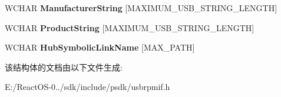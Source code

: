 \begin{DoxyCompactItemize}
W\+C\+H\+AR {\bfseries Manufacturer\+String} \mbox{[}M\+A\+X\+I\+M\+U\+M\+\_\+\+U\+S\+B\+\_\+\+S\+T\+R\+I\+N\+G\+\_\+\+L\+E\+N\+G\+TH\mbox{]}
\item 
\mbox{\label{struct___u_s_b_r_p_m___d_e_v_i_c_e___i_n_f_o_r_m_a_t_i_o_n_a944a87dc3f27776fcbbbfb9d198a40c7}} 
W\+C\+H\+AR {\bfseries Product\+String} \mbox{[}M\+A\+X\+I\+M\+U\+M\+\_\+\+U\+S\+B\+\_\+\+S\+T\+R\+I\+N\+G\+\_\+\+L\+E\+N\+G\+TH\mbox{]}
\item 
\mbox{\label{struct___u_s_b_r_p_m___d_e_v_i_c_e___i_n_f_o_r_m_a_t_i_o_n_a69ceef0f51f1f8cf4c55fe63a59a1e7d}} 
W\+C\+H\+AR {\bfseries Hub\+Symbolic\+Link\+Name} \mbox{[}M\+A\+X\+\_\+\+P\+A\+TH\mbox{]}
\end{DoxyCompactItemize}


该结构体的文档由以下文件生成\+:\begin{DoxyCompactItemize}
\item 
E\+:/\+React\+O\+S-\/0../sdk/include/psdk/usbrpmif.\+h\end{DoxyCompactItemize}
